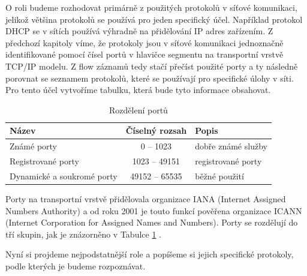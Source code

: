 \documentclass[thesis=B,czech,hidelinks]{FITthesis}[2019/03/21]
\begin{document}
    O roli budeme rozhodovat primárně z použitých protokolů v síťové komunikaci, jelikož většina protokolů se používá pro jeden specifický účel. Například protokol DHCP se v sítích používá výhradně na přidělování IP adres zařízením. Z předchozí kapitoly víme, že protokoly jsou v síťové komunikaci jednoznačně identifikované pomocí čísel portů v hlavičce segmentu na transportní vrstvě TCP/IP modelu. Z flow záznamů tedy stačí přečíst použité porty a ty následně porovnat se seznamem protokolů, které se používají pro specifické úlohy v síti. Pro tento účel vytvoříme tabulku, která bude tyto informace obsahovat.
    \begin{table}[h]
        \centering
        \caption{Rozdělení portů}
        \label{Ports}
        \begin{tabular}{|p{5cm}|c|p{4cm}|}\hline
            Název & Číselný rozsah & Popis \\\hline\hline
            Známé porty & 0 -- 1023 & dobře známé služby \\\hline
            Registrované porty & 1023 -- 49151 & registrované porty \\\hline
            Dynamické a soukromé porty & 49152 -- 65535 & běžné použití \\\hline
        \end{tabular}
    \end{table}
    
    Porty na transportní vrstvě přidělovala organizace IANA (Internet Assigned Numbers Authority) a od roku 2001 je touto funkcí pověřena organizace ICANN (Internet Corporation for Assigned Names and Numbers). Porty se rozdělují do tří skupin, jak je znázorněno v Tabulce \ref{Ports} \cite{IANA}.
    
    Nyní si projdeme nejpodstatnější role a popíšeme si jejich specifické protokoly, podle kterých je budeme rozpoznávat.
\end{document}
